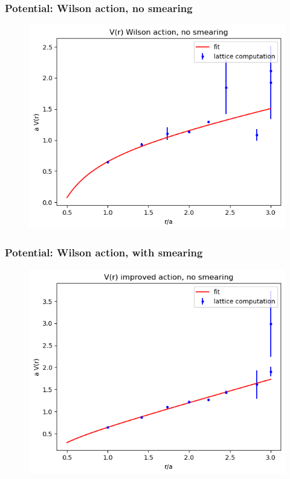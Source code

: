 \documentclass{beamer}
\begin{document}
\begin{frame}
\frametitle{Potential: Wilson action, no smearing}
\begin{figure}
    \centering
    \includegraphics[width=0.8\linewidth]{output1.png}
\end{figure}
\end{frame}

\begin{frame}
\frametitle{Potential: Wilson action, with smearing}
\begin{figure}
    \centering
    \includegraphics[width=0.8\linewidth]{output2.png}
\end{figure}
\end{frame}
\end{document}
